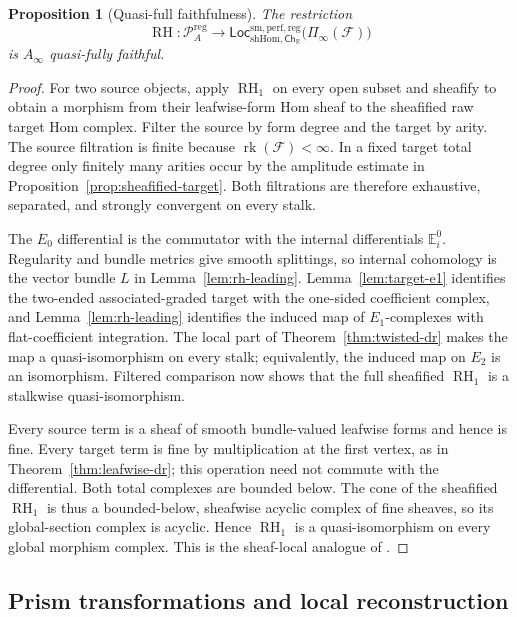 \documentclass[12pt]{amsart}
\newtheorem{prop}[thm]{Proposition}
\theoremstyle{definition}
\theoremstyle{remark}
\numberwithin{equation}{section}
\newcommand{\CF}{{\mathcal F}}
\newcommand{\A}{{A}}
\newcommand{\R}{{\mathbb{R}}}
\newcommand{\1}{{\mathbb{1}}}
\newcommand{\Ch}{\mathsf{Ch}}
\newcommand{\Loc}{\mathsf{Loc}}
\newcommand{\RH}{\operatorname{RH}}
\newcommand{\rk}{\operatorname{rk}}
\begin{document}
\begin{prop}[Quasi-full faithfulness]\label{prop:qff}
The restriction
\[
 \RH:\mathcal P_{\A}^{\mathrm{reg}}
 \longrightarrow
 \Loc_{\mathrm{shHom},\Ch_{\R}}^{\mathrm{sm,perf,reg}}
 \bigl(\Pi_{\infty}(\CF)\bigr)
\]
is $A_{\infty}$ quasi-fully faithful.
\end{prop}

\begin{proof}
For two source objects, apply $\RH_1$ on every open subset and
sheafify to obtain a morphism from their leafwise-form Hom sheaf to
the sheafified raw target Hom complex.  Filter the source by form
degree and the target by arity.  The source filtration is finite
because $\rk(\CF)<\infty$.  In a fixed target total degree only
finitely many arities occur by the amplitude estimate in
Proposition~\ref{prop:sheafified-target}.  Both filtrations are
therefore exhaustive, separated, and strongly convergent on every
stalk.

The $E_0$ differential is the commutator with the internal
differentials $\mathbb E_i^0$.  Regularity and bundle metrics give
smooth splittings, so internal cohomology is the vector bundle $L$ in
Lemma~\ref{lem:rh-leading}.  Lemma~\ref{lem:target-e1} identifies the
two-ended associated-graded target with the one-sided coefficient
complex, and Lemma~\ref{lem:rh-leading} identifies the induced map of
$E_1$-complexes with flat-coefficient integration.  The local part of
Theorem~\ref{thm:twisted-dr} makes the map a quasi-isomorphism on
every stalk; equivalently, the induced map on $E_2$ is an isomorphism.
Filtered comparison now shows that the full sheafified $\RH_1$ is a
stalkwise quasi-isomorphism.

Every source term is a sheaf of smooth bundle-valued leafwise forms
and hence is fine.  Every target term is fine by multiplication at the
first vertex, as in Theorem~\ref{thm:leafwise-dr}; this operation need
not commute with the differential.  Both total complexes are bounded
below.  The cone of the sheafified $\RH_1$ is thus a bounded-below,
sheafwise acyclic complex of fine sheaves, so its global-section
complex is acyclic.  Hence $\RH_1$ is a quasi-isomorphism on every
global morphism complex.  This is the sheaf-local analogue of
\cite[Proposition 4.3]{BS14}.
\end{proof}

\subsection{Prism transformations and local reconstruction}
\end{document}

